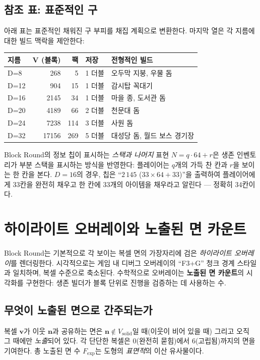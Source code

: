 \documentclass[12pt,a4paper]{scrartcl}
\newcommand{\acc}[1]{\textcolor{accent}{\textbf{#1}}}
\begin{document}
\subsection{참조 표: 표준적인 구}
아래 표는 표준적인 채워진 구 부피를 채집 계획으로 변환한다. 마지막 열은 각 지름에 대한 빌드 맥락을 제안한다:
\nopagebreak

\vspace{0.4em}
\begin{center}
\small
\begin{tabularx}{\textwidth}{@{}lrrlX@{}}
\toprule
\textbf{지름} & \textbf{V (블록)} & \textbf{팩} & \textbf{저장} & \textbf{전형적인 빌드} \\
\midrule
D=8   &   268 &  5  &  1 더블 & 오두막 지붕, 우물 돔  \\
D=12  &   904 & 15  &  1 더블 & 감시탑 꼭대기 \\
D=16  &  2145 & 34  &  1 더블 & 마을 종, 도서관 돔 \\
D=20  &  4189 & 66  &  2 더블 & 천문대 돔 \\
D=24  &  7238 & 114 &  3 더블 & 사원 돔 \\
D=32  & 17156 & 269 &  5 더블 & 대성당 돔, 월드 보스 경기장 \\
\bottomrule
\end{tabularx}
\end{center}

Block Round의 정보 칩이 표시하는 \emph{스택과 나머지} 표현 $N = q \cdot 64 + r$은 생존 인벤토리가 부분 스택을 표시하는 방식을 반영한다: 플레이어는 $q$개의 가득 찬 칸과 $r$을 보이는 한 칸을 본다. $D=16$의 경우, 칩은 \enquote{$2\,145$ ($33 \times 64 + 33$)}을 출력하여 플레이어에게 $33$칸을 완전히 채우고 한 칸에 $33$개의 아이템을 채우라고 알린다 — 정확히 $34$칸이다.

\section{하이라이트 오버레이와 노출된 면 카운트}

Block Round는 기본적으로 각 보이는 복셀 면의 가장자리에 검은 \emph{하이라이트 오버레이}를 렌더링한다. 시각적으로는 게임 내 디버그 오버레이의 \enquote{F3+G} 청크 경계 스타일과 일치하며, 복셀 수준으로 축소된다. 수학적으로 오버레이는 \acc{노출된 면 카운트}의 시각화를 구현한다: 생존 빌더가 블록 단위로 진행을 검증하는 데 사용하는 수.

\subsection{무엇이 노출된 면으로 간주되는가}
복셀 $\mathbf{v}$가 이웃 $\mathbf{n}$과 공유하는 면은 $\mathbf{n} \notin V_{\mathrm{solid}}$일 때(이웃이 비어 있을 때) 그리고 오직 그 때에만 \emph{노출}되어 있다. 각 단단한 복셀은 $0$(완전히 묻힘)에서 $6$(고립됨)까지의 면을 기여한다. 총 노출된 면 수 $F_{\mathrm{exp}}$는 도형의 \emph{표면적}의 이산 유사물이다.
\end{document}
